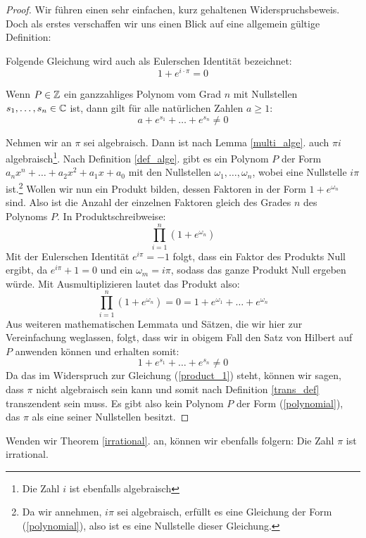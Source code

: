 \documentclass[11pt]{article}
\begin{document}
\begin{proof}
     Wir führen einen sehr einfachen, kurz gehaltenen Widerspruchsbeweis. Doch als erstes verschaffen wir uns einen Blick auf eine allgemein gültige Definition:
    \begin{definition}
        Folgende Gleichung wird auch als Eulerschen Identität bezeichnet: \[1+e^{i\cdot\pi}=0\]
    \end{definition}
    \begin{definition}
        Wenn $P\in \mathbb Z$ ein ganzzahliges Polynom vom Grad $n$ mit Nullstellen $s_1,\dots,s_n \in\mathbb C$ ist, dann gilt für alle natürlichen Zahlen $a\geq1:$ \[a+e^{s_1}+\dots+e^{s_n}\neq 0\]
    \end{definition}
    Nehmen wir an $\pi$ sei algebraisch. Dann ist nach Lemma \ref{multi_alge}. auch $\pi i$ algebraisch\footnote{Die Zahl $i$ ist ebenfalls algebraisch}. Nach Definition \ref{def_alge}. gibt es ein Polynom $P$ der Form $a_nx^n+\dots+a_2x^2+a_1x+a_0$ mit den Nullstellen $\omega_1,\dots,\omega_n$, wobei eine Nullstelle $i\pi$ ist.\footnote{Da wir annehmen, $i\pi$ sei algebraisch, erfüllt es eine Gleichung der Form (\ref{polynomial}), also ist es eine Nullstelle dieser Gleichung.} Wollen wir nun ein Produkt bilden, dessen Faktoren in der Form $1+e^{\omega_n}$ sind. Also ist die Anzahl der einzelnen Faktoren gleich des Grades $n$ des Polynoms $P$. In Produktschreibweise: 
    \[\prod_{i=1}^{n} (1+e^{\omega_n})\] 
    Mit der Eulerschen Identität $e^{i\pi}=-1$ folgt, dass ein Faktor des Produkts Null ergibt, da $e^{i\pi}+1=0$ und ein $\omega_m=i\pi$, sodass das ganze Produkt Null ergeben würde. Mit Ausmultiplizieren lautet das Produkt also: \begin{equation}\label{product_1}
        \prod_{i=1}^{n} (1+e^{\omega_n}) =0=1+e^{\omega_1}+\dots+e^{\omega_n}
    \end{equation}                                            
    Aus weiteren mathematischen Lemmata und Sätzen, die wir hier zur Vereinfachung weglassen, folgt, dass wir in obigem Fall den Satz von Hilbert auf $P$ anwenden können und erhalten somit: \[1+e^{s_1}+\dots+e^{s_n}\neq 0\] Da das im Widerspruch zur Gleichung (\ref{product_1}) steht, können wir sagen, dass $\pi$ nicht algebraisch sein kann und somit nach Definition \ref{trans_def} transzendent sein muss. Es gibt also kein Polynom $P$ der Form (\ref{polynomial}), das $\pi$ als eine seiner Nullstellen besitzt. 
\end{proof}
Wenden wir Theorem \ref{irrational}. an, können wir ebenfalls folgern: Die Zahl $\pi$ ist irrational. \newline\newline
\end{document}
